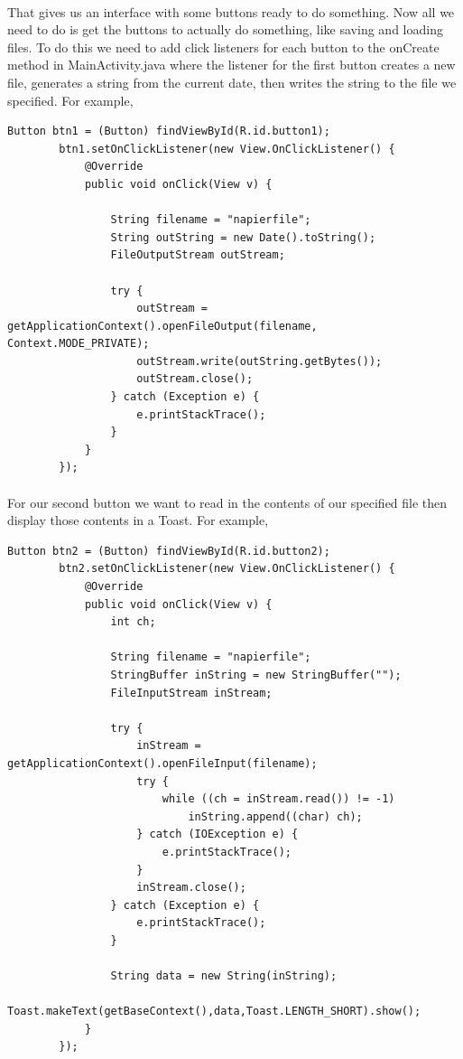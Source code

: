 \documentclass[12pt, a4paper, twoside]{book}
\begin{document}
\paragraph{} That gives us an interface with some buttons ready to do something. Now all we need to do is get the buttons to actually do something, like saving and loading files. To do this we need to add click listeners for each button to the onCreate method in MainActivity.java where the listener for the first button creates a new file, generates a string from the current date, then writes the string to the file we specified. For example, 

\begin{lstlisting}
Button btn1 = (Button) findViewById(R.id.button1);
        btn1.setOnClickListener(new View.OnClickListener() {
            @Override
            public void onClick(View v) {

                String filename = "napierfile";
                String outString = new Date().toString();
                FileOutputStream outStream;

                try {
                    outStream = getApplicationContext().openFileOutput(filename, Context.MODE_PRIVATE);
                    outStream.write(outString.getBytes());
                    outStream.close();
                } catch (Exception e) {
                    e.printStackTrace();
                }
            }
        });
\end{lstlisting}

\paragraph{} For our second button we want to read in the contents of our specified file then display those contents in a Toast. For example,

\begin{lstlisting}
Button btn2 = (Button) findViewById(R.id.button2);
        btn2.setOnClickListener(new View.OnClickListener() {
            @Override
            public void onClick(View v) {
                int ch;

                String filename = "napierfile";
                StringBuffer inString = new StringBuffer("");
                FileInputStream inStream;

                try {
                    inStream = getApplicationContext().openFileInput(filename);
                    try {
                        while ((ch = inStream.read()) != -1)
                            inString.append((char) ch);
                    } catch (IOException e) {
                        e.printStackTrace();
                    }
                    inStream.close();
                } catch (Exception e) {
                    e.printStackTrace();
                }

                String data = new String(inString);
                Toast.makeText(getBaseContext(),data,Toast.LENGTH_SHORT).show();
            }
        });
\end{lstlisting}
\end{document}
